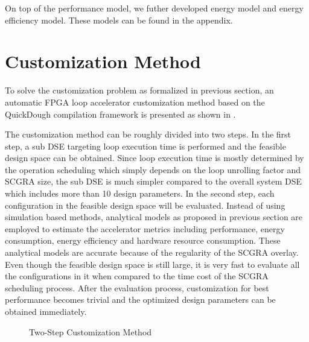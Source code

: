 On top of the performance model, we futher developed energy model and energy efficiency model. These models can be found in the appendix. 
 
\section{Customization Method}
To solve the customization problem as formalized in previous section, an automatic FPGA loop accelerator customization method based on the QuickDough compilation framework is presented as shown in . 

The customization method can be roughly divided into two steps. In the first step, a sub DSE targeting loop execution time is performed and the feasible design space can be obtained. Since loop execution time is mostly determined by the operation scheduling which simply depends on the loop unrolling factor and SCGRA size, the sub DSE is much simpler compared to the overall system DSE which includes more than 10 design parameters. In the second step, each configuration in the feasible design space will be evaluated. Instead of using simulation based methods, analytical models as proposed in previous section are employed to estimate the accelerator metrics including performance, energy consumption, energy efficiency and hardware resource consumption. These analytical models are accurate because of the regularity of the SCGRA overlay. Even though the feasible design space is still large, it is very fast to evaluate all the configurations in it when compared to the time cost of the SCGRA scheduling process. After the evaluation process, customization for best performance becomes trivial and the optimized design parameters can be obtained immediately.

\begin{figure}[t]
\caption{Two-Step Customization Method}
\label{fig:customization-framework}
\end{figure}

